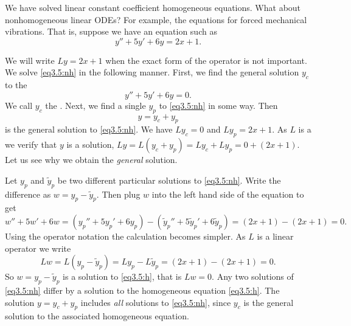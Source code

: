 We have solved linear constant coefficient homogeneous 
equations.
What about nonhomogeneous linear ODEs?
For example, the equations for forced mechanical vibrations.
That is, suppose we have an equation such as
\begin{equation} \label{eq3.5:nh}
y'' + 5y'+ 6y = 2x+1 .
\end{equation}

We will write $Ly = 2x+1$ when the exact form of the operator is not
important.
We solve \eqref{eq3.5:nh} in the following manner.  First, we find the general
solution $y_c$
to the \emph{}
\begin{equation} \label{eq3.5:h}
y'' + 5y'+ 6y = 0 .
\end{equation}
We call $y_c$ the \emph{}.
Next, we find a
single \emph{} $y_p$ to \eqref{eq3.5:nh} in some
way.  Then
\begin{equation*}
y = y_c + y_p
\end{equation*}
is the general solution to \eqref{eq3.5:nh}.  
We have $L y_c = 0$ and $L y_p = 2x+1$.  As
$L$ is a \emph{}
we verify that $y$ is a solution, $L y = L ( y_c + y_p) = L y_c + L y_p = 0
+ (2x+1)$.  Let us see
why we obtain the \emph{general} solution.

Let $y_p$ and $\tilde{y}_p$ be two different
particular solutions 
to \eqref{eq3.5:nh}.
Write the difference as
$w = y_p - \tilde{y}_p$.  Then plug $w$
into the left hand side of the equation to get
\begin{equation*}
w'' + 5w'+ 6w =
(y_p'' + 5y_p'+ 6y_p) -
(\tilde{y}_p'' + 5\tilde{y}_p'+ 6\tilde{y}_p) =
(2x+1) - (2x+1) = 0 .
\end{equation*}
Using the operator notation the calculation becomes simpler.
As $L$ is a linear operator we write
\begin{equation*}
Lw = L(y_p - \tilde{y}_p) =
Ly_p - L\tilde{y}_p =
(2x+1)-(2x+1) = 0 .
\end{equation*}
So $w = y_p - \tilde{y}_p$ is a solution to \eqref{eq3.5:h}, that is
$Lw = 0$.  Any two
solutions of \eqref{eq3.5:nh} differ by a solution to the homogeneous
equation \eqref{eq3.5:h}.  The solution $y = y_c + y_p$ includes \emph{all}
solutions to \eqref{eq3.5:nh},
since $y_c$ is the general solution to the associated homogeneous equation.

